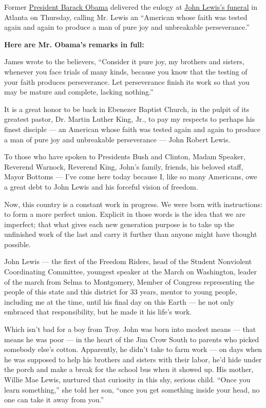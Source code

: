 Former
\href{https://www.nytimes3xbfgragh.onion/2020/08/19/us/politics/obama-speech.html}{President
Barack Obama} delivered the eulogy at
\href{https://www.nytimes3xbfgragh.onion/2020/07/30/us/john-lewis-live-funeral.html}{John
Lewis's funeral} in Atlanta on Thursday, calling Mr. Lewis an ``American
whose faith was tested again and again to produce a man of pure joy and
unbreakable perseverance.''

\textbf{Here are Mr. Obama's remarks in full:}

James wrote to the believers, ``Consider it pure joy, my brothers and
sisters, whenever you face trials of many kinds, because you know that
the testing of your faith produces perseverance. Let perseverance finish
its work so that you may be mature and complete, lacking nothing.''

It is a great honor to be back in Ebenezer Baptist Church, in the pulpit
of its greatest pastor, Dr. Martin Luther King, Jr., to pay my respects
to perhaps his finest disciple --- an American whose faith was tested
again and again to produce a man of pure joy and unbreakable
perseverance --- John Robert Lewis.

To those who have spoken to Presidents Bush and Clinton, Madam Speaker,
Reverend Warnock, Reverend King, John's family, friends, his beloved
staff, Mayor Bottoms --- I've come here today because I, like so many
Americans, owe a great debt to John Lewis and his forceful vision of
freedom.

Now, this country is a constant work in progress. We were born with
instructions: to form a more perfect union. Explicit in those words is
the idea that we are imperfect; that what gives each new generation
purpose is to take up the unfinished work of the last and carry it
further than anyone might have thought possible.

John Lewis --- the first of the Freedom Riders, head of the Student
Nonviolent Coordinating Committee, youngest speaker at the March on
Washington, leader of the march from Selma to Montgomery, Member of
Congress representing the people of this state and this district for 33
years, mentor to young people, including me at the time, until his final
day on this Earth --- he not only embraced that responsibility, but he
made it his life's work.

Which isn't bad for a boy from Troy. John was born into modest means ---
that means he was poor --- in the heart of the Jim Crow South to parents
who picked somebody else's cotton. Apparently, he didn't take to farm
work --- on days when he was supposed to help his brothers and sisters
with their labor, he'd hide under the porch and make a break for the
school bus when it showed up. His mother, Willie Mae Lewis, nurtured
that curiosity in this shy, serious child. ``Once you learn something,''
she told her son, ``once you get something inside your head, no one can
take it away from you.''

